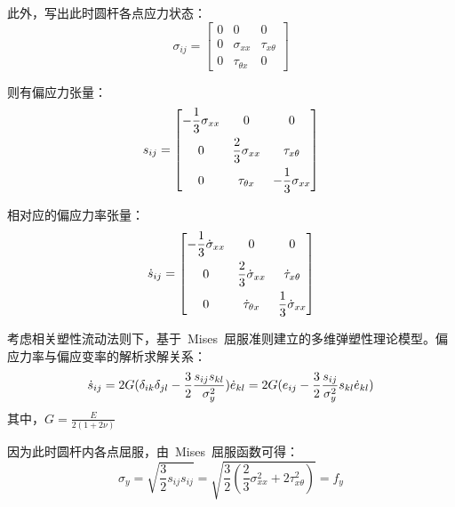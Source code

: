 此外，写出此时圆杆各点应力状态：
\begin{equation}\label{eq14}
    \sigma_{ij} = \begin{bmatrix}
        0 & 0 & 0 \\
        0 & \sigma_{xx} & \tau_{x \theta}\\
        0 & \tau_{\theta x} & 0
        \end{bmatrix}
\end{equation} 

则有偏应力张量：
\begin{equation}\label{eq15}
    s_{ij} = \begin{bmatrix}
        -\dfrac{1}{3}\sigma_{xx} & 0 & 0 \vspace{1ex}\\
        0 & \dfrac{2}{3}\sigma_{xx} & \tau_{x \theta}\vspace{1ex}\\
        0 & \tau_{\theta x} & -\dfrac{1}{3}\sigma_{xx}
        \end{bmatrix}
\end{equation} 

相对应的偏应力率张量：
\begin{equation}\label{eq16}
    \dot s_{ij} = \begin{bmatrix}
        -\dfrac{1}{3}\dot \sigma_{xx} & 0 & 0 \vspace{1ex}\\
        0 & \dfrac{2}{3}\dot \sigma_{xx} & \dot \tau_{x \theta}\vspace{1ex}\\
        0 & \dot \tau_{\theta x} & \dfrac{1}{3}\dot \sigma_{xx}
        \end{bmatrix}
\end{equation} 

考虑相关塑性流动法则下，基于~Mises~屈服准则建立的多维弹塑性理论模型。偏应力率与偏应变率的解析求解关系：
\begin{equation}\label{eq17}
    \dot s_{ij} = 2G(\delta_{ik}\delta_{jl}-\dfrac{3}{2}\dfrac{s_{ij}s_{kl}}{\sigma_{y}^2}) \dot e_{kl} \\
    = 2G(e_{ij}-\dfrac{3}{2}\dfrac{s_{ij}}{\sigma_{y}^2}s_{kl} \dot e_{kl})
\end{equation}
其中，{$G=\frac{E}{2(1+2\nu)}$}

因为此时圆杆内各点屈服，由~Mises~屈服函数可得：
\begin{equation}\label{eq18}
    \sigma_y = \sqrt{\dfrac{3}{2} s_{ij} s_{ij}} = \sqrt{\dfrac{3}{2}(\dfrac{2}{3}\sigma_{xx}^2 + 2\tau_{x \theta}^2)} = f_y
\end{equation}

